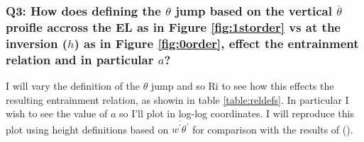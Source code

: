 \subsubsection{Q3: How does defining the $\theta$ jump based on the vertical $\overline{\theta}$ proifle accross the \acs{EL} as in Figure \ref{fig:1storder} vs at the inversion ($h$) as in Figure \ref{fig:0order}, effect the entrainment relation and in particular $a$?}

I will vary the definition of the $\theta$ jump and so \acs{Ri} to see how this effects the resulting entrainment relation, as showin in table \ref{table:reldefs}.  In particular I wish to see the value of $a$ so I'll plot in log-log coordinates.  I will reproduce this plot using height definitions based on $\overline{w^{'}\theta^{'}}$ for comparison with the results of \citeauthor{FedConzMir04} (\citeyear{FedConzMir04}).

\endinput

Any text after an \endinput is ignored.
You could put scraps here or things in progress.



